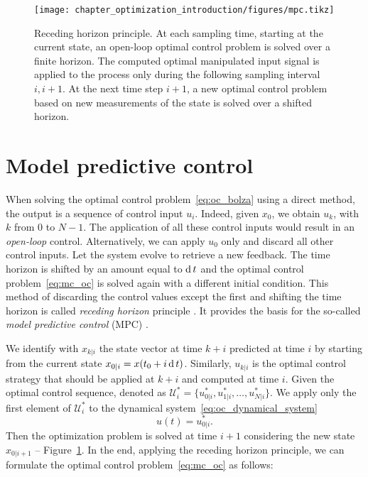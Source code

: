 \begin{figure}[h]
\centering
    \texttt{[image: chapter\_optimization\_introduction/figures/mpc.tikz]}
	\caption[Receding horizon principle.]{Receding horizon principle. At each sampling time, starting at the current state, an open-loop optimal control problem is solved over a finite horizon. The computed optimal manipulated input signal is applied to the process only during the following sampling interval $i, i+1$. At the next time step $i+1$, a new optimal control problem based on new measurements of the state is solved over a shifted horizon.}
	\label{fig:mpc}
\end{figure}
\section{Model predictive control} \label{sec:mpc}
When solving the optimal control problem~\eqref{eq:oc_bolza} using a direct method, the output is a sequence of control input $u_i$. Indeed, given $x_0$, we obtain $u_k$, with $k$ from $0$ to $N-1$. The application of all these control inputs would result in an \emph{open-loop} control. Alternatively, we can apply $u_0$ only and discard all other control inputs. Let the system evolve to retrieve a new feedback. The time horizon is shifted by an amount equal to $\operatorname{d} t$ and the optimal control problem~\eqref{eq:mc_oc} is solved again with a different initial condition. This method of discarding the control values except the first and shifting the time horizon is called \emph{receding horizon} principle \citep{Mayne90MPC,Shahriar2013ComparisonSystem}. It provides the basis for the so-called \emph{model predictive control} (MPC) \citep{bemporad2002hybrid,Garcia1989ModelSurvey}. 
\par
We identify with $x_{k|i}$ the state vector at time $k+i$ predicted at time $i$ by starting from the current state $x_{0|i} = x(t_0 + i \operatorname{d} t)$. Similarly, $u_{k|i}$ is the optimal control strategy that should be applied at $k+i$ and computed at time $i$. Given the optimal control sequence, denoted as $\mathcal{U}^*_i = \{ u^*_{0|i}, u^*_{1|i}, \hdots, u^*_{N|i} \}$. We apply only the first element of $\mathcal{U}^*_i$ to the dynamical system~\eqref{eq:oc_dynamical_system}
\begin{equation}
    u(t) = u^*_{0|i}.
\end{equation}
Then the optimization problem is solved at time $i+1$ considering the new state $x_{0|i+1}$ -- Figure~\ref{fig:mpc}. 
In the end, applying the receding horizon principle, we can formulate the optimal control problem~\eqref{eq:mc_oc} as follows:

